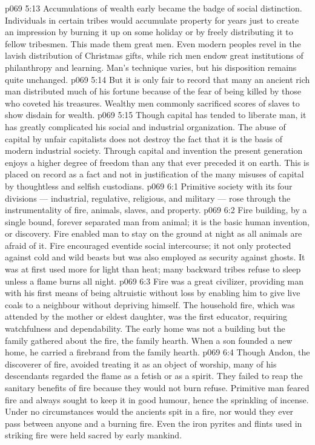 \vs p069 5:13 Accumulations of wealth early became the badge of social distinction. Individuals in certain tribes would accumulate property for years just to create an impression by burning it up on some holiday or by freely distributing it to fellow tribesmen. This made them great men. Even modern peoples revel in the lavish distribution of Christmas gifts, while rich men endow great institutions of philanthropy and learning. Man’s technique varies, but his disposition remains quite unchanged.
\vs p069 5:14 But it is only fair to record that many an ancient rich man distributed much of his fortune because of the fear of being killed by those who coveted his treasures. Wealthy men commonly sacrificed scores of slaves to show disdain for wealth.
\vs p069 5:15 Though capital has tended to liberate man, it has greatly complicated his social and industrial organization. The abuse of capital by unfair capitalists does not destroy the fact that it is the basis of modern industrial society. Through capital and invention the present generation enjoys a higher degree of freedom than any that ever preceded it on earth. This is placed on record as a fact and not in justification of the many misuses of capital by thoughtless and selfish custodians.
\vs p069 6:1 Primitive society with its four divisions --- industrial, regulative, religious, and military --- rose through the instrumentality of fire, animals, slaves, and property.
\vs p069 6:2 Fire building, by a single bound, forever separated man from animal; it is the basic human invention, or discovery. Fire enabled man to stay on the ground at night as all animals are afraid of it. Fire encouraged eventide social intercourse; it not only protected against cold and wild beasts but was also employed as security against ghosts. It was at first used more for light than heat; many backward tribes refuse to sleep unless a flame burns all night.
\vs p069 6:3 Fire was a great civilizer, providing man with his first means of being altruistic without loss by enabling him to give live coals to a neighbour without depriving himself. The household fire, which was attended by the mother or eldest daughter, was the first educator, requiring watchfulness and dependability. The early home was not a building but the family gathered about the fire, the family hearth. When a son founded a new home, he carried a firebrand from the family hearth.
\vs p069 6:4 \pc Though Andon, the discoverer of fire, avoided treating it as an object of worship, many of his descendants regarded the flame as a fetish or as a spirit. They failed to reap the sanitary benefits of fire because they would not burn refuse. Primitive man feared fire and always sought to keep it in good humour, hence the sprinkling of incense. Under no circumstances would the ancients spit in a fire, nor would they ever pass between anyone and a burning fire. Even the iron pyrites and flints used in striking fire were held sacred by early mankind.
